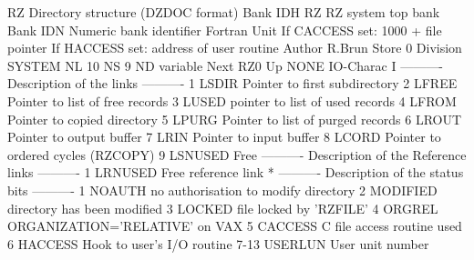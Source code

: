 \begin{XMPt}{RZ Directory structure (DZDOC format)}
\label{xmp:rztop}
 Bank IDH  RZ       RZ system top bank                                          
 Bank IDN           Numeric bank identifier
                    Fortran Unit
                    If CACCESS set: 1000 + file pointer
                    If HACCESS set: address of user routine
 Author             R.Brun                                                      
 Store     0                                                                    
 Division  SYSTEM                                                               
 NL              10                                                             
 NS               9                                                             
 ND        variable                                                             
 Next      RZ0                                                                  
 Up        NONE                                                                 
 IO-Charac          I                                                           
              ---------- Description of the links  ----------
 1         LSDIR    Pointer to first subdirectory                               
 2         LFREE    Pointer to list of free records                             
 3         LUSED    pointer to list of used records                             
 4         LFROM    Pointer to copied directory                                 
 5         LPURG    Pointer to list of purged records                           
 6         LROUT    Pointer to output buffer                                    
 7         LRIN     Pointer to input buffer                                     
 8         LCORD    Pointer to ordered cycles (RZCOPY)                          
 9         LSNUSED  Free                                                        
              ---------- Description of the Reference links  ----------
 1         LRNUSED  Free reference link *                                       
              ---------- Description of the status bits ----------
 1         NOAUTH   no authorisation to modify directory                        
 2         MODIFIED directory has been modified                                 
 3         LOCKED   file locked by 'RZFILE'                                     
 4         ORGREL   ORGANIZATION='RELATIVE' on VAX                              
 5         CACCESS  C file access routine used                                  
 6         HACCESS  Hook to user's I/O routine
 7-13      USERLUN  User unit number

\end{XMPt}

